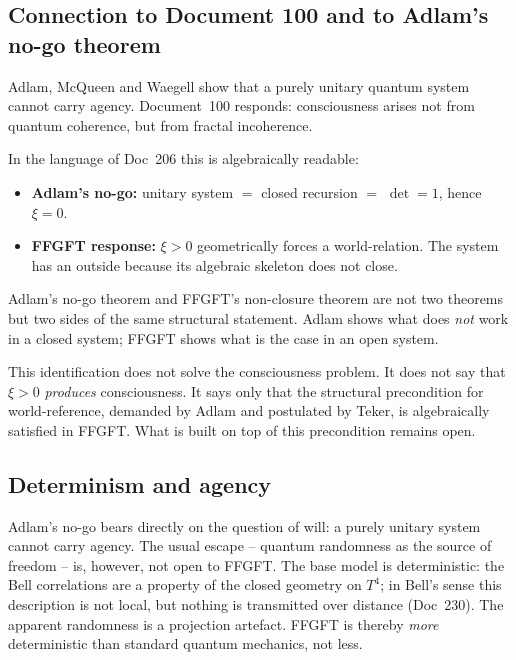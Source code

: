 \subsection{Connection to Document 100 and to Adlam's no-go theorem}

Adlam, McQueen and Waegell show that a purely unitary quantum system cannot carry agency. Document~100 responds: consciousness arises not from quantum coherence, but from fractal incoherence.

In the language of Doc~206 this is algebraically readable:

\begin{itemize}
\item \textbf{Adlam's no-go:} unitary system $=$ closed recursion $=$ $\det = 1$, hence $\xi = 0$.
\item \textbf{FFGFT response:} $\xi > 0$ geometrically forces a world-relation. The system has an outside because its algebraic skeleton does not close.
\end{itemize}

Adlam's no-go theorem and FFGFT's non-closure theorem are not two theorems but two sides of the same structural statement. Adlam shows what does \emph{not} work in a closed system; FFGFT shows what is the case in an open system.

\begin{interpretation}
This identification does not solve the consciousness problem. It does not say that $\xi > 0$ \emph{produces} consciousness. It says only that the structural precondition for world-reference, demanded by Adlam and postulated by Teker, is algebraically satisfied in FFGFT. What is built on top of this precondition remains open.
\end{interpretation}

\subsection{Determinism and agency}\label{sec:bridgeA_determinism}

Adlam's no-go bears directly on the question of will: a purely unitary system cannot carry agency. The usual escape -- quantum randomness as the source of freedom -- is, however, not open to FFGFT. The base model is deterministic: the Bell correlations are a property of the closed geometry on $T^4$; in Bell's sense this description is not local, but nothing is transmitted over distance (Doc~230). The apparent randomness is a projection artefact. FFGFT is thereby \emph{more} deterministic than standard quantum mechanics, not less.


